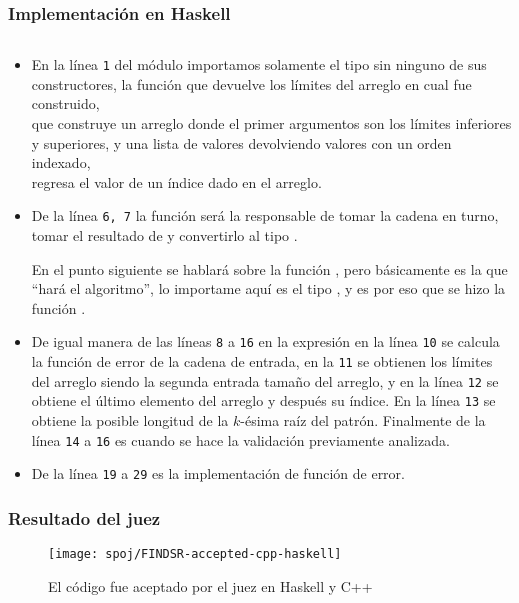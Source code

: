 \subsubsection{Implementación en Haskell}
\inputminted[linenos, frame=lines]{haskell}{problemas/haskell/FINDSR.hs}

\begin{itemize}
\item En la línea \texttt{1} del módulo  importamos solamente el tipo
 sin ninguno de sus constructores, la función 
que devuelve los límites del arreglo en cual fue construido,\\
 que construye un arreglo donde el primer
argumentos son los límites inferiores y superiores, y una lista de valores devolviendo valores
con un orden indexado,\\
  regresa el valor de un índice dado en el arreglo.

\item De la línea \texttt{6, 7} la función  será la responsable de tomar la cadena en
turno, tomar el resultado de  y convertirlo al tipo .

En el punto siguiente se hablará sobre la función , pero básicamente es
la que ``hará el algoritmo'', lo importame aquí es el tipo , y es por eso que se hizo
la función .

\item De igual manera de las líneas \texttt{8} a \texttt{16} en la expresión 
en la línea \texttt{10} se calcula la función de error de la cadena de entrada, en la \texttt{11}
se obtienen los límites del arreglo siendo la segunda entrada tamaño del arreglo, y en la línea
\texttt{12} se obtiene el último elemento del arreglo y después su índice. En la línea \texttt{13}
se obtiene la posible longitud de la $k$-ésima raíz del patrón. Finalmente de la línea \texttt{14}
a \texttt{16} es cuando se hace la validación previamente analizada.

\item De la línea \texttt{19} a \texttt{29} es la implementación de función de error.
\end{itemize}

\subsubsection{Resultado del juez}
\begin{figure}[H]
\centering
\texttt{[image: spoj/FINDSR-accepted-cpp-haskell]}
\caption{El código fue aceptado por el juez en Haskell y C++}
\end{figure}

